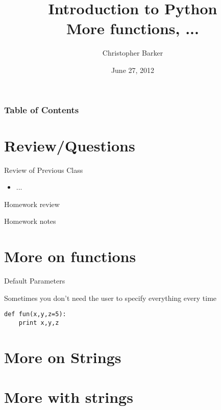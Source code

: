 \documentclass{beamer}
\title[Intro to Python: Week 2]{Introduction  to Python\\ More functions, ...}
\author{Christopher Barker}
\institute{UW Continuing Education / Isilon}
\date{June 27, 2012}
\begin{document}
\begin{frame}
  \titlepage
\end{frame}

\begin{frame}
\frametitle{Table of Contents}
  \tableofcontents
\end{frame}


\section{Review/Questions}

\begin{frame}{Review of Previous Class}

\begin{itemize}
  \item ...
\end{itemize}

\end{frame}


\begin{frame}{Homework review}

  {\Large Homework notes }

\end{frame}

\section{More on functions}

\begin{frame}[fragile]{Default Parameters}

 {\Large Sometimes you don't need the user to specify everything every time}

\begin{verbatim}
def fun(x,y,z=5):
    print x,y,z
\end{verbatim}

\end{frame} 


\section{More on Strings}

\section{More with strings}
\end{document}
